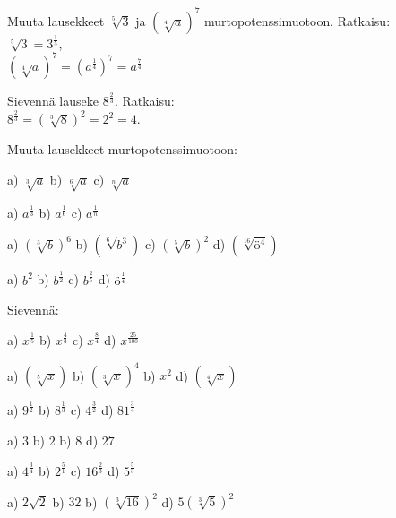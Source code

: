 \begin{esimerkki}
Muuta lausekkeet $\sqrt[5]{3}$ ja $(\sqrt[4]{a})^7$ murtopotenssimuotoon. Ratkaisu: \\
$\sqrt[5]{3} = 3^\frac{1}{5}$, \\
$(\sqrt[4]{a})^7 = (a^\frac{1}{4})^7=a^\frac{7}{4}$
\end{esimerkki}

\begin{esimerkki}
Sievennä lauseke $8^\frac{2}{3}$. Ratkaisu: \\
 $8^\frac{2}{3} = (\sqrt[3]{8})^2 = 2^2 = 4.$
\end{esimerkki}

Muuta lausekkeet murtopotenssimuotoon:

\begin{tehtava}
a) $\sqrt[3]{a}$ \qquad
b) $\sqrt[6]{a}$ \qquad
c) $\sqrt[n]{a}$ 
\begin{vastaus}	
a) $a^\frac{1}{3}$ \qquad
b) $a^\frac{1}{6}$ \qquad
c) $a^\frac{1}{n}$ \qquad
\end{vastaus}
\end{tehtava}

\begin{tehtava}
a) $(\sqrt[3]{b})^6$ \qquad
b) $(\sqrt[6]{b^3})$ \qquad
c) $(\sqrt[5]{b})^2$ \qquad
d) $(\sqrt[16]{ö^4})$
\begin{vastaus}	
a) $b^2$ \qquad
b) $b^\frac{1}{2}$ \qquad
c) $b^\frac{2}{5}$ \qquad
d) $ö^\frac{1}{4}$
\end{vastaus}
\end{tehtava}

Sievennä:
\begin{tehtava}
a) $x^\frac{1}{5}$ \qquad
b) $x^\frac{4}{3}$ \qquad
c) $x^\frac{8}{4}$ \qquad
d) $x^\frac{25}{100}$ \qquad
\begin{vastaus}	
a) $(\sqrt[5]{x})$ \qquad
b) $(\sqrt[3]{x})^4$ \qquad
b) $x^2$ \qquad
d) $(\sqrt[4]{x})$ 
\end{vastaus}
\end{tehtava}

\begin{tehtava}
a) $9^\frac{1}{2}$ \qquad
b) $8^\frac{1}{3}$ \qquad
c) $4^\frac{3}{2}$ \qquad
d) $81^\frac{3}{4}$ \qquad
\begin{vastaus}	
a) $3$ \qquad
b) $2$ \qquad
b) $8$ \qquad
d) $27$ 
\end{vastaus}
\end{tehtava}

\begin{tehtava}
a) $4^\frac{3}{4}$ \qquad
b) $2^\frac{5}{1}$ \qquad
c) $16^\frac{2}{3}$ \qquad
d) $5^\frac{5}{3}$ \qquad
\begin{vastaus}	
a) $2\sqrt{2}$ \qquad
b) $32$ \qquad
b) $(\sqrt[3]{16})^2$ \qquad
d) $5(\sqrt[3]{5})^2$ 
\end{vastaus}
\end{tehtava}

